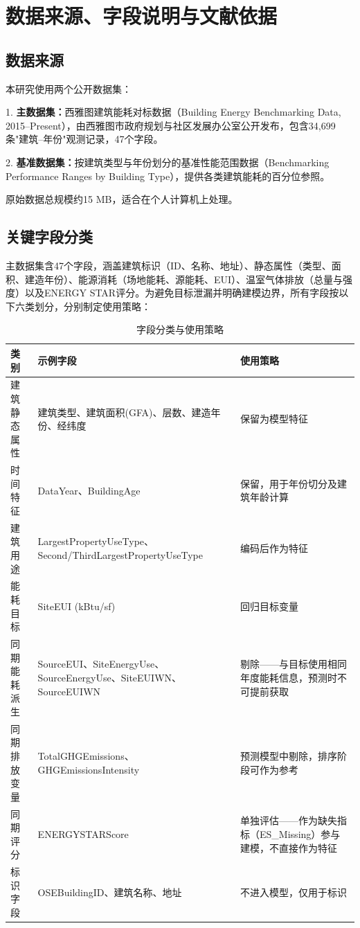\section{数据来源、字段说明与文献依据}

\subsection{数据来源}

本研究使用两个公开数据集：

1. \textbf{主数据集：}西雅图建筑能耗对标数据（Building Energy Benchmarking Data, 2015--Present），由西雅图市政府规划与社区发展办公室公开发布，包含34,699条"建筑--年份"观测记录，47个字段\cite{seattle_benchmarking}。

2. \textbf{基准数据集：}按建筑类型与年份划分的基准性能范围数据（Benchmarking Performance Ranges by Building Type），提供各类建筑能耗的百分位参照\cite{seattle_benchmarking}。

原始数据总规模约15 MB，适合在个人计算机上处理。

\subsection{关键字段分类}

主数据集含47个字段，涵盖建筑标识（ID、名称、地址）、静态属性（类型、面积、建造年份）、能源消耗（场地能耗、源能耗、EUI）、温室气体排放（总量与强度）以及ENERGY STAR评分。为避免目标泄漏并明确建模边界，所有字段按以下六类划分，分别制定使用策略：

\begin{table}[H]
\centering
\caption{字段分类与使用策略}
\label{tab:field_classification}
\begin{tabular}{p{2.2cm}p{3.8cm}p{5.5cm}}
\hline
\textbf{类别} & \textbf{示例字段} & \textbf{使用策略} \\
\hline
建筑静态属性 & 建筑类型、建筑面积(GFA)、层数、建造年份、经纬度 & 保留为模型特征 \\
\hline
时间特征 & DataYear、BuildingAge & 保留，用于年份切分及建筑年龄计算 \\
\hline
建筑用途 & LargestPropertyUseType、Second/ThirdLargestPropertyUseType & 编码后作为特征 \\
\hline
能耗目标 & SiteEUI (kBtu/sf) & 回归目标变量 \\
\hline
同期能耗派生 & SourceEUI、SiteEnergyUse、SourceEnergyUse、SiteEUIWN、SourceEUIWN & 剔除——与目标使用相同年度能耗信息，预测时不可提前获取 \\
\hline
同期排放变量 & TotalGHGEmissions、GHGEmissionsIntensity & 预测模型中剔除，排序阶段可作为参考 \\
\hline
同期评分 & ENERGYSTARScore & 单独评估——作为缺失指标（ES\_Missing）参与建模，不直接作为特征 \\
\hline
标识字段 & OSEBuildingID、建筑名称、地址 & 不进入模型，仅用于标识 \\
\hline
\end{tabular}
\end{table}

